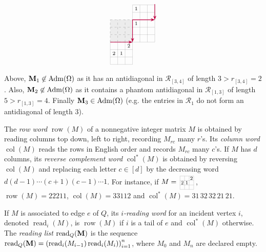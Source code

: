 \documentclass[12pt]{amsart}
\DeclareMathOperator{\Std}{\operatorname{Adm}}
\newcommand{\cell}{.28}
\newcommand{\tile}[5]{%
\begin{scope}[shift={(#1,#2)}]
  \draw[line width =.1pt, step=\cell] (0,0) grid ({#3*\cell},{#4*\cell});
  #5
\end{scope}
}
\newcommand{\phantomtile}[5]{%
\begin{scope}[shift={(#1,#2)}]
  \fill[gray!15] (0,0) rectangle ({#3*\cell},{#4*\cell});
  \draw[gray!70, dashed, step=\cell] (0,0) grid ({#3*\cell},{#4*\cell});
  #5
\end{scope}
}
\newcommand{\numcell}[3]{%
  \node at ({(#1+.5)*\cell},{(2.5-#2)*\cell}) {\scriptsize $#3$};
}
\theoremstyle{definition}
\theoremstyle{remark}
\begin{document}
\[{{\begin{tikzpicture}[scale=1.3, baseline=-.5ex]
\tile{0}{0}{3}{3}{
  \numcell{2}{0}{2}
  \numcell{1}{1}{1}
  \numcell{0}{1}{2}
}

{\phantomtile{0}{.84}{3}{3}{
}}

\tile{.84}{.84}{3}{3}{
  \numcell{0}{0}{1}
}

\tile{.84}{1.68}{3}{2}{
  \numcell{0}{1}{1}
}

\draw[purple, -{Stealth[length=2mm,width=1.5mm]}, thick] (0,.84) -- (.84,.84);
\draw[purple, -{Stealth[length=2mm,width=1.5mm]}, thick] (.84,1.68) -- (.84,.84);
\draw[purple, -{Stealth[length=2mm,width=1.5mm]}, thick] (.84,1.68) -- (1.68,1.68);
\draw[purple, -{Stealth[length=2mm,width=1.5mm]}, thick] (1.68,2.27) -- (1.68,1.68);
\end{tikzpicture}}}
\]
Above, ${\bf M}_1\not\in \Std(\Omega)$ as it has an antidiagonal in ${\mathcal R}_{[3,4]}$ of length
$3>r_{[3,4]}=2$. Also, ${\bf M}_2\not\in \Std(\Omega)$  as it contains a phantom antidiagonal
in ${\mathcal R}_{[1,3]}$ of length $5>r_{[1,3]}=4$. Finally ${\bf M}_3\in \Std(\Omega)$  (e.g. the entries in ${\mathcal R}_1$
do not form an antidiagonal of length $3$).

The \emph{row word} ${\operatorname{row}}(M)$ of a nonnegative integer matrix $M$ is obtained by reading columns top down, left to right, recording $M_{rc}$ many $r$'s. Its \emph{column word} ${\operatorname{col}}(M)$
reads the rows in English order and records $M_{rc}$ many $c$'s. If $M$ has $d$ columns, 
its \emph{reverse complement word} ${\operatorname{col}}^*(M)$ is obtained by reversing ${\operatorname{col}}(M)$ and replacing each letter $c\in [d]$ by the decreasing word
 $d(d-1)\cdots(c+1)(c-1)\cdots 1$. For instance, if $M= 
 \vcenter{\hbox{\begin{tikzpicture}[scale=0.8, baseline=-.2ex]
\tile{0}{0}{3}{3}{
  \numcell{2}{0}{2}
  \numcell{1}{1}{1}
  \numcell{0}{1}{2}
}
\end{tikzpicture}}}$,
 $\operatorname{row}(M)=22211$,
 $\operatorname{col}(M)=33112$ and $\operatorname{col}^*(M)=31\, 32 \, 32\, 21\, 21$.
 
If $M$ is associated to edge $e$ of $Q$, its \emph{$i$-reading word} for  an incident vertex $i$,
denoted $\operatorname{read}_i(M)$, is $\operatorname{row}(M)$ if $i$ is a tail of $e$ and 
${\operatorname{col}}^*(M)$ otherwise. 
The \emph{reading list} $\operatorname{read}_Q({\bf M})$ is the sequence
$\operatorname{read}_Q({\bf M})=
\left(\operatorname{read}_i(M_{i-1})\operatorname{read}_i(M_i)\right)_{i=1}^n$,
where $M_0$ and $M_n$ are declared empty.
\end{document}
